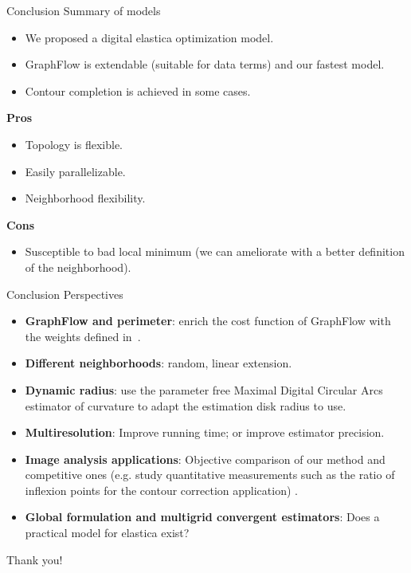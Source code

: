 \begin{frame}
{Conclusion}
{Summary of models}

\begin{itemize}
\item{We proposed a digital elastica optimization model.}
\item{GraphFlow is extendable (suitable for data terms) and our fastest model.}
\item{Contour completion is achieved in some cases.}
\end{itemize}

\textbf{Pros}
\begin{itemize}
\item{Topology is flexible.}
\item{Easily parallelizable.}
\item{Neighborhood flexibility.}
\end{itemize}

\textbf{Cons}
\begin{itemize}
\item{Susceptible to bad local minimum (we can ameliorate with a better definition of the neighborhood).}
\end{itemize}

\end{frame}

\begin{frame}
{Conclusion}
{Perspectives}

\begin{itemize}
\item{\textbf{GraphFlow and perimeter}: enrich the cost function of GraphFlow with the weights defined in~. }

\item{\textbf{Different neighborhoods}: random, linear extension.}

\item{\textbf{Dynamic radius}: use the parameter free Maximal Digital Circular Arcs estimator of curvature to adapt the estimation disk radius to use.}

\item{\textbf{Multiresolution}: Improve running time; or improve estimator precision.}

\item{\textbf{Image analysis applications}: Objective comparison of our method and competitive ones (e.g. study quantitative measurements such as the ratio of inflexion points for the contour correction application) .}

\item{\textbf{Global formulation and multigrid convergent estimators}:
    Does a practical model for elastica exist?}
\end{itemize}

\end{frame}

\begin{frame}
\huge
\center
Thank you!
\end{frame}
